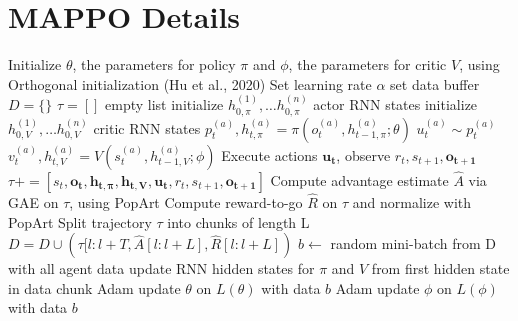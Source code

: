 

\section{MAPPO Details}
\label{app:mappo-details}

\begin{algorithm}
    \caption{Recurrent-MAPPO}
    \label{algo:mappo}
\begin{algorithmic}
    \STATE  Initialize $\theta$, the parameters for policy $\pi$ and $\phi$, the parameters for critic $V$, using Orthogonal initialization (Hu et al., 2020) \; %
    \STATE Set learning rate $\alpha$
    \STATE set data buffer $D = \{\}$
    \STATE $\tau = []$ empty list
    \STATE initialize $h_{0, \pi}^{(1)}, \dots h_{0, \pi}^{(n)}$ actor RNN states
    \STATE initialize $h_{0, V}^{(1)}, \dots h_{0, V}^{(n)}$ critic RNN states
    \STATE $p_t^{(a)}, h_{t, \pi}^{(a)} = \pi(o_t^{(a)}, h_{t-1, \pi}^{(a)}; \theta)$
    \STATE $u_t^{(a)} \sim p_t^{(a)}$
    \STATE $v_t^{(a)}, h_{t, V}^{(a)} = V(s_t^{(a)},h_{t-1, V}^{(a)}; \phi) $
    \ENDFOR 
    \STATE Execute actions $\boldsymbol{u_t}$, observe $r_t, s_{t+1}, \boldsymbol{o_{t+1}}$
    \STATE $\tau += [s_t, \boldsymbol{o_t}, \boldsymbol{h_{t, \pi}}, \boldsymbol{h_{t, V}}, \boldsymbol{u_t}, r_t, s_{t+1}, \boldsymbol{o_{t+1}}]$
    \ENDFOR
    \STATE Compute advantage estimate $\hat{A}$ via GAE on $\tau$, using PopArt
    \STATE Compute reward-to-go $\hat{R}$ on $\tau$ and normalize with PopArt
    \STATE Split trajectory $\tau$ into chunks of length L
    \STATE $D = D \cup (\tau[l : l + T, \hat{A}[l : l + L], \hat{R}[l : l + L])$
    \ENDFOR 
    \ENDFOR 
    \STATE $b \leftarrow$ random mini-batch from D with all agent data
    \STATE update RNN hidden states for $\pi$ and $V$ from first hidden state in data chunk
    \ENDFOR
    \ENDFOR
    \STATE Adam update $\theta$ on $L(\theta)$ with data $b$
    \STATE Adam update $\phi$ on $L(\phi)$ with data $b$
    \ENDWHILE
\end{algorithmic}
\end{algorithm}

